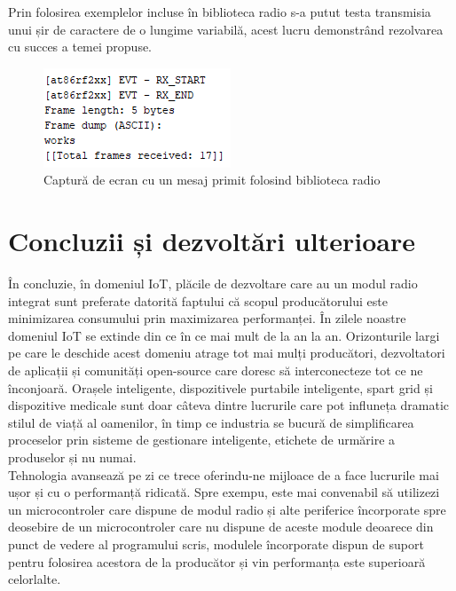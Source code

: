 \documentclass[12pt,a4paper]{report}
\begin{document}
Prin folosirea exemplelor incluse în biblioteca radio s-a putut testa transmisia unui șir de caractere de o lungime variabilă, acest lucru demonstrând rezolvarea cu succes a temei propuse.
\begin{figure}[!htb]
\centering
\includegraphics[scale=0.9]{pics/demoreceive.png}
  \caption{Captură de ecran cu un mesaj primit folosind biblioteca radio}
  \label{fig:demoreceive}
\end{figure}

\chapter{Concluzii și dezvoltări ulterioare}
În concluzie, în domeniul IoT, plăcile de dezvoltare care au un modul radio integrat sunt preferate datorită faptului că scopul producătorului este minimizarea consumului prin maximizarea performanței. În zilele noastre domeniul IoT se extinde din ce în ce mai mult de la an la an. Orizonturile largi pe care le deschide acest domeniu atrage tot mai mulți producători, dezvoltatori de aplicații și comunități open-source care doresc să interconecteze tot ce ne înconjoară. Orașele inteligente, dispozitivele purtabile inteligente, spart grid și dispozitive medicale sunt doar câteva dintre lucrurile care pot influneța dramatic stilul de viață al oamenilor, în timp ce industria se bucură de simplificarea proceselor prin sisteme de gestionare inteligente, etichete de urmărire a produselor și nu numai. \\
Tehnologia avansează pe zi ce trece oferindu-ne mijloace de a face lucrurile mai ușor și cu o performanță ridicată. Spre exempu, este mai convenabil să utilizezi un microcontroler care dispune de modul radio și alte periferice încorporate spre deosebire de un microcontroler care nu dispune de aceste module deoarece din punct de vedere al programului scris, modulele încorporate dispun de suport pentru folosirea acestora de la producător și vin performanța este superioară celorlalte.
\end{document}
